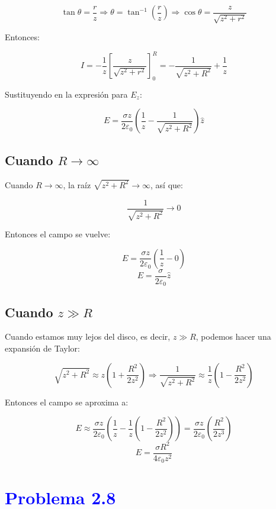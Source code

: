 \documentclass[12pt]{article}
\newcommand{\question}[1]{\textcolor{blue}{\textbf{#1}}}
\begin{document}
\[
\tan\theta = \frac{r}{z} \Rightarrow \theta = \tan^{-1}\left( \frac{r}{z} \right)
\Rightarrow \cos\theta = \frac{z}{\sqrt{z^2 + r^2}}
\]

Entonces:

\[
I = -\frac{1}{z} \left[ \frac{z}{\sqrt{z^2 + r^2}} \right]_0^R 
= -\frac{1}{\sqrt{z^2 + R^2}} + \frac{1}{z}
\]

Sustituyendo en la expresión para \( E_z \):

\[ 
\boxed{
E = \frac{\sigma z}{2 \varepsilon_0} \left( \frac{1}{z} - \frac{1}{\sqrt{z^2 + R^2}} \right) \hat{z}
}
\]


\subsection*{ Cuando \( R \to \infty \) }

Cuando \( R \to \infty \), la raíz \( \sqrt{z^2 + R^2}  \to \infty  \), así que:

\[
\frac{1}{\sqrt{z^2 + R^2}} \to 0
\]

Entonces el campo se vuelve:

\[
E = \frac{\sigma z}{2 \varepsilon_0} \left( \frac{1}{z} - 0 \right) 
\]
\[
\boxed {
E =\frac{\sigma}{2\varepsilon_0} \hat{z}
}
\]



\subsection*{Cuando \( z \gg R \) }

Cuando estamos muy lejos del disco, es decir, \( z \gg R \), podemos hacer una expansión de Taylor:

\[
\sqrt{z^2 + R^2} \approx z \left(1 + \frac{R^2}{2z^2}\right)
\Rightarrow \frac{1}{\sqrt{z^2 + R^2}} \approx \frac{1}{z} \left(1 - \frac{R^2}{2z^2}\right)
\]

Entonces el campo se aproxima a:

\[
E \approx \frac{\sigma z}{2 \varepsilon_0} \left( \frac{1}{z} - \frac{1}{z} \left(1 - \frac{R^2}{2z^2} \right) \right)
= \frac{\sigma z}{2 \varepsilon_0} \left( \frac{R^2}{2z^3} \right)
\]
\[ 
\boxed{
E = \frac{\sigma R^2}{4\varepsilon_0 z^2}
}
\]





\section*{\question{ Problema 2.8}}  
\end{document}
